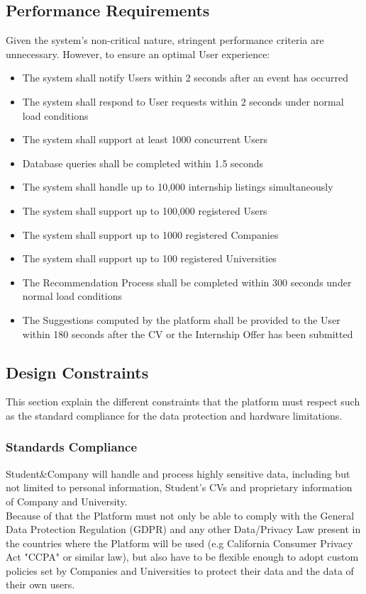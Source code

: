 \subsection{Performance Requirements}
 Given the system's non-critical nature, stringent performance criteria are unnecessary. However, to ensure an optimal User experience:
\begin{itemize}
  \item The system shall notify Users within 2 seconds after an event has occurred
  \item The system shall respond to User requests within 2 seconds under normal load conditions
  \item The system shall support at least 1000 concurrent Users
  \item Database queries shall be completed within 1.5 seconds
  \item The system shall handle up to 10,000 internship listings simultaneously
  \item The system shall support up to 100,000 registered Users
  \item The system shall support up to 1000 registered Companies
  \item The system shall support up to 100 registered Universities
  \item The Recommendation Process shall be completed within 300 seconds under normal load conditions
  \item The Suggestions computed by the platform shall be provided to the User within 180 seconds after the CV or the Internship Offer has been submitted
\end{itemize}
\subsection{Design Constraints}
This section explain the different constraints that the platform must respect such as the standard compliance for the data protection and hardware limitations.
\subsubsection{Standards Compliance}
Student\&Company will handle and process highly sensitive data, including but not limited to personal information, Student's CVs and proprietary information of Company and University.\\
Because of that the Platform must not only be able to comply with the General Data Protection Regulation (GDPR) and any other Data/Privacy Law present in the countries where the Platform will be used (e.g California Consumer Privacy Act "CCPA" or similar law), but also have to be flexible enough to adopt custom policies set by Companies and Universities to protect their data and the data of their own users.
